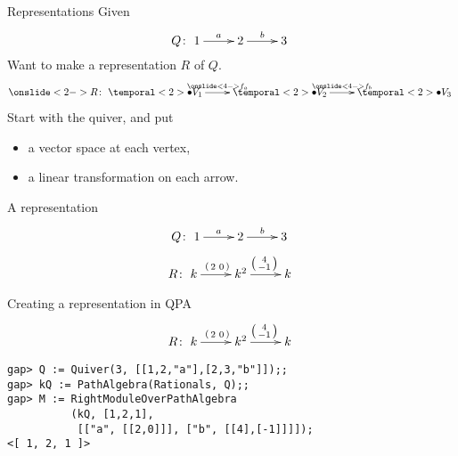 \begin{frame}{Representations}
Given
\[
Q \colon
\xymatrix{1 \ar[r]^a & 2 \ar[r]^b & 3}
\]
Want to make a representation $R$ of $Q$.
\[
\onslide<2->{R \colon}
\xymatrix{
\temporal<2>{}{\bullet}{V_1} \ar[r]^{\onslide<4->{f_a}} &
\temporal<2>{}{\bullet}{V_2} \ar[r]^{\onslide<4->{f_b}} &
\temporal<2>{}{\bullet}{V_3}
}
\]
Start with the quiver, and put
\begin{itemize}
\item a vector space at each vertex,
\item a linear transformation on each arrow.
\end{itemize}
\end{frame}

\begin{frame}{A representation}
\Large
\[
Q \colon
\xymatrix{1 \ar[r]^a & 2 \ar[r]^b & 3}
\]
\vspace{.5em}
\[
R \colon
\xymatrix{
k   \ar[r]^{\left( \begin{smallmatrix} 2 & 0 \end{smallmatrix} \right)} &
k^2 \ar[r]^{\left( \begin{smallmatrix} 4 \\ -1 \end{smallmatrix} \right)} &
k
}
\]
\end{frame}

\begin{frame}[fragile]{Creating a representation in QPA}
\[
R \colon
\xymatrix{
k   \ar[r]^{\left( \begin{smallmatrix} 2 & 0 \end{smallmatrix} \right)} &
k^2 \ar[r]^{\left( \begin{smallmatrix} 4 \\ -1 \end{smallmatrix} \right)} &
k
}
\]
\begin{verbatim}
gap> Q := Quiver(3, [[1,2,"a"],[2,3,"b"]]);;
gap> kQ := PathAlgebra(Rationals, Q);;
gap> M := RightModuleOverPathAlgebra
          (kQ, [1,2,1],
           [["a", [[2,0]]], ["b", [[4],[-1]]]]);
<[ 1, 2, 1 ]>
\end{verbatim}
\end{frame}

